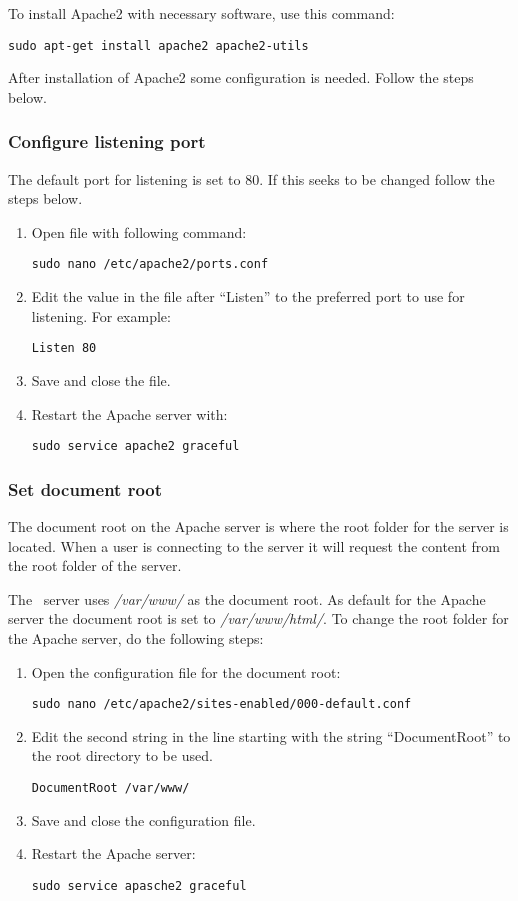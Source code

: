 To install Apache2 with necessary software, use this command:
\begin{verbatim}
sudo apt-get install apache2 apache2-utils
\end{verbatim}
After installation of Apache2 some configuration is needed. Follow the steps below.
\subsubsection{Configure listening port}\label{ports}
The default port for listening is set to 80. If this seeks to be changed follow the steps below.
\begin{enumerate}
	\item Open file with following command: \begin{verbatim}sudo nano /etc/apache2/ports.conf\end{verbatim}
    \item Edit the value in the file after ``Listen'' to the preferred port to use for listening. 
    For example: \begin{verbatim}Listen 80\end{verbatim}
    \item Save and close the file.
    \item Restart the Apache server with: \begin{verbatim}sudo service apache2 graceful\end{verbatim}
\end{enumerate}

\subsubsection{Set document root}\label{sec:exp_docroot}
The document root on the Apache server is where the root folder for the server is located. When a user is connecting to the server it will request the content from the root folder of the server.

The \appName\ server uses \textit{/var/www/} as the document root. As default for the Apache server 
the document root is set to \textit{/var/www/html/}.
To change the root folder for the Apache server, do the following steps:
\begin{enumerate}
	\item Open the configuration file for the document root: \begin{verbatim}sudo nano /etc/apache2/sites-enabled/000-default.conf\end{verbatim}
    \item Edit the second string in the line starting with the string ``DocumentRoot'' to the root directory to be used.
    \begin{verbatim}DocumentRoot /var/www/\end{verbatim}
    \item Save and close the configuration file.
    \item Restart the Apache server: \begin{verbatim}sudo service apasche2 graceful\end{verbatim}
\end{enumerate}

